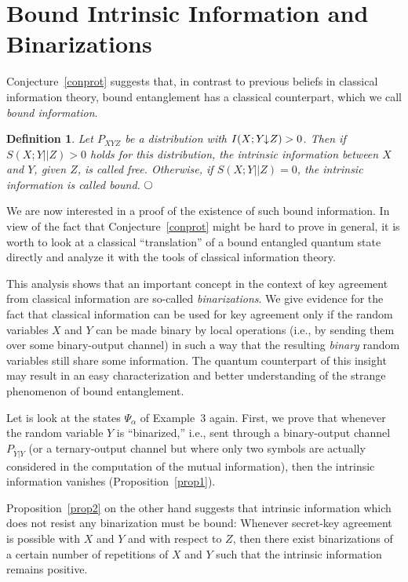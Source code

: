 \documentclass{article}
\newtheorem{defi}{Definition}
\newcommand{\textcirc}{%
  \setlength{\unitlength}{1.5ex}%
  \begin{picture}(1.1,1)(-.55,-.55)%
    \put(0,0){\circle{1.1}}%
  \end{picture}}
\newcommand{\defend}{\hspace*{\fill} $\textcirc$}
\newcommand{\al}{\alpha}
\newcommand{\OY}{\overline{Y}}
\newcommand{\ida}{I(X;Y\hspace{-1.3mm}\downarrow\hspace{-0.8mm} Z)}
\begin{document}
\section{Bound Intrinsic Information and Binarizations}\label{secbii}

Conjecture~\ref{conprot} suggests that, in contrast to previous 
beliefs in classical information theory, bound entanglement has a 
classical counterpart, which we call {\em bound information}.


\begin{defi}
{\rm
Let $P_{XYZ}$ be a  distribution with $\ida>0$. Then if $S(X;Y||Z)>0$
holds for this distribution, the intrinsic information between $X$ and $Y$,
given $Z$, is called {\em free}. Otherwise, if $S(X;Y||Z)=0$, the 
intrinsic information is called {\em bound}.
}
\defend
\end{defi}


We are now interested in a proof of the existence of such bound information.
In view of the fact that Conjecture~\ref{conprot} might be hard to prove 
in general, it is worth to look at a classical ``translation'' of a 
bound entangled quantum state directly and analyze it with the tools 
of classical information theory. 

This analysis shows that an important concept 
in the context of key agreement from classical information are so-called
{\em binarizations}. We give evidence for the fact that classical 
information can be used for key agreement only if the random variables 
$X$ and $Y$ can be made binary by local operations (i.e., by sending 
them over some binary-output channel) in such a way that the resulting 
{\em binary\/} random variables still share some information. The quantum
counterpart of this insight may result in an easy characterization 
and better understanding of the strange phenomenon of bound entanglement.

Let is look at the states $\Psi_{\al}$ of Example~3 again. 
First, we prove that whenever the random variable $Y$ is ``binarized,''
i.e., sent through a binary-output channel $P_{\OY|Y}$ (or a ternary-output
channel but where only two symbols are actually
 considered in the computation of the mutual information), then the intrinsic 
information vanishes (Proposition~\ref{prop1}).

Proposition~\ref{prop2}
 on the other hand suggests that intrinsic information which 
does not resist any binarization must be bound: Whenever secret-key agreement 
is possible with $X$ and  $Y$ and with respect to $Z$, then there exist 
binarizations of 
a certain number of 
repetitions of $X$ and $Y$ such that the 
intrinsic information remains positive. 
\end{document}
